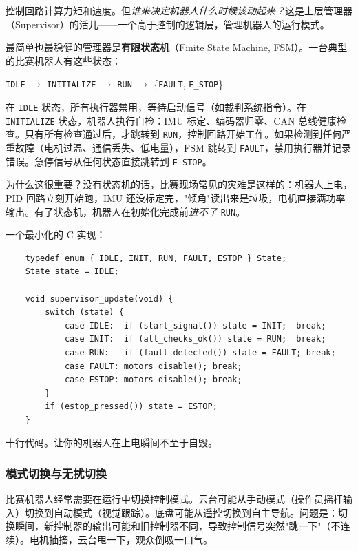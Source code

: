 控制回路计算力矩和速度。但\textit{谁来决定机器人什么时候该动起来？}这是上层管理器（Supervisor）的活儿——一个高于控制的逻辑层，管理机器人的运行模式。

最简单也最稳健的管理器是\textbf{有限状态机}（Finite State Machine, FSM）。一台典型的比赛机器人有这些状态：

\begin{center}
\texttt{IDLE} $\to$ \texttt{INITIALIZE} $\to$ \texttt{RUN} $\to$ \{\texttt{FAULT}, \texttt{E\_STOP}\}
\end{center}

在 \texttt{IDLE} 状态，所有执行器禁用，等待启动信号（如裁判系统指令）。在 \texttt{INITIALIZE} 状态，机器人执行自检：IMU 标定、编码器归零、CAN 总线健康检查。只有所有检查通过后，才跳转到 \texttt{RUN}，控制回路开始工作。如果检测到任何严重故障（电机过温、通信丢失、低电量），FSM 跳转到 \texttt{FAULT}，禁用执行器并记录错误。急停信号从任何状态直接跳转到 \texttt{E\_STOP}。

为什么这很重要？没有状态机的话，比赛现场常见的灾难是这样的：机器人上电，PID 回路立刻开始跑，IMU 还没标定完，"倾角"读出来是垃圾，电机直接满功率输出。有了状态机，机器人在初始化完成前\textit{进不了} \texttt{RUN}。

一个最小化的 C 实现：

\begin{verbatim}
    typedef enum { IDLE, INIT, RUN, FAULT, ESTOP } State;
    State state = IDLE;

    void supervisor_update(void) {
        switch (state) {
            case IDLE:  if (start_signal()) state = INIT;  break;
            case INIT:  if (all_checks_ok()) state = RUN;  break;
            case RUN:   if (fault_detected()) state = FAULT; break;
            case FAULT: motors_disable(); break;
            case ESTOP: motors_disable(); break;
        }
        if (estop_pressed()) state = ESTOP;
    }
\end{verbatim}

十行代码。让你的机器人在上电瞬间不至于自毁。

\subsubsection{模式切换与无扰切换}

比赛机器人经常需要在运行中切换控制模式。云台可能从手动模式（操作员摇杆输入）切换到自动模式（视觉跟踪）。底盘可能从遥控切换到自主导航。问题是：切换瞬间，新控制器的输出可能和旧控制器不同，导致控制信号突然"跳一下"（不连续）。电机抽搐，云台甩一下，观众倒吸一口气。

